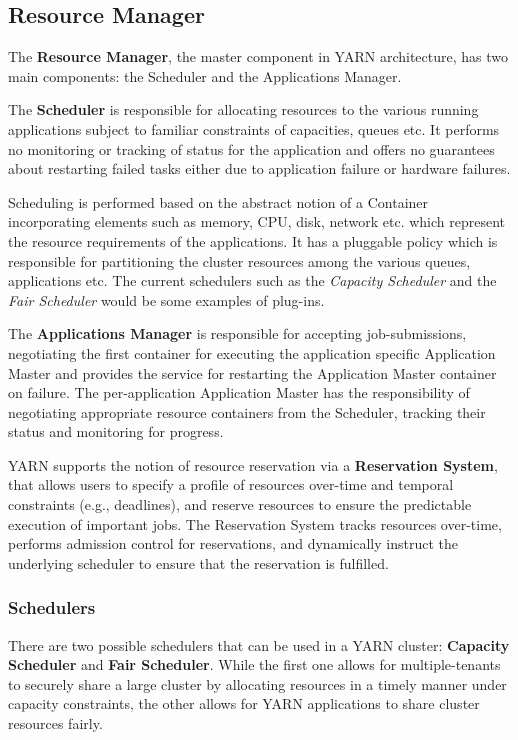 \subsection{Resource Manager}

The \textbf{Resource Manager}, the master component in YARN architecture, has two main components: the Scheduler and the Applications Manager.

The \textbf{Scheduler} is responsible for allocating resources to the various running applications subject to familiar constraints of capacities, queues etc. It performs no monitoring or tracking of status for the application and offers no guarantees about restarting failed tasks either due to application failure or hardware failures. 

Scheduling is performed based on the abstract notion of a Container incorporating elements such as memory, CPU, disk, network etc. which represent the resource requirements of the applications. It has a pluggable policy which is responsible for partitioning the cluster resources among the various queues, applications etc. The current schedulers such as the \textit{Capacity Scheduler} and the \textit{Fair Scheduler} would be some examples of plug-ins.

The \textbf{Applications Manager} is responsible for accepting job-submissions, negotiating the first container for executing the application specific Application Master and provides the service for restarting the Application Master container on failure. The per-application Application Master has the responsibility of negotiating appropriate resource containers from the Scheduler, tracking their status and monitoring for progress.

YARN supports the notion of resource reservation via a \textbf{Reservation System}, that allows users to specify a profile of resources over-time and temporal constraints (e.g., deadlines), and reserve resources to ensure the predictable execution of important jobs. The Reservation System tracks resources over-time, performs admission control for reservations, and dynamically instruct the underlying scheduler to ensure that the reservation is fulfilled.

\subsubsection{Schedulers}

There are two possible schedulers that can be used in a YARN cluster: \textbf{Capacity Scheduler} and \textbf{Fair Scheduler}. While the first one allows for multiple-tenants to securely share a large cluster by allocating resources in a timely manner under capacity constraints, the other allows for YARN applications to share cluster resources fairly.

